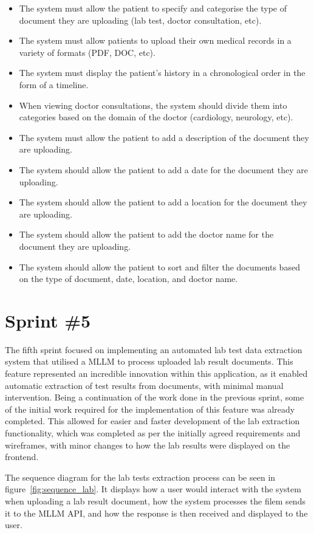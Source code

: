 \begin{itemize}
  \item The system must allow the patient to specify and categorise the type of document they are uploading (lab test, doctor consultation, etc).
  \item The system must allow patients to upload their own medical records in a variety of formats (PDF, DOC, etc).
  \item The system must display the patient's history in a chronological order in the form of a timeline.
  \item When viewing doctor consultations, the system should divide them into categories based on the domain of the doctor (cardiology, neurology, etc).
  \item The system must allow the patient to add a description of the document they are uploading.
  \item The system should allow the patient to add a date for the document they are uploading.
  \item The system should allow the patient to add a location for the document they are uploading.
  \item The system should allow the patient to add the doctor name for the document they are uploading.
  \item The system should allow the patient to sort and filter the documents based on the type of document, date, location, and doctor name. 
\end{itemize}

\section{Sprint \#5}

The fifth sprint focused on implementing an automated lab test data extraction system that utilised a MLLM to process uploaded lab result documents. This feature represented an incredible innovation within this application, as it enabled automatic extraction of test results from documents, with minimal manual intervention. Being a continuation of the work done in the previous sprint, some of the initial work required for the implementation of this feature was already completed. This allowed for easier and faster development of the lab extraction functionality, which was completed as per the initially agreed requirements and wireframes, with minor changes to how the lab results were displayed on the frontend. 

The sequence diagram for the lab tests extraction process can be seen in figure~\ref{fig:sequence_lab}. It displays how a user would interact with the system when uploading a lab result document, how the system processes the filem sends it to the MLLM API, and how the response is then received and displayed to the user.

